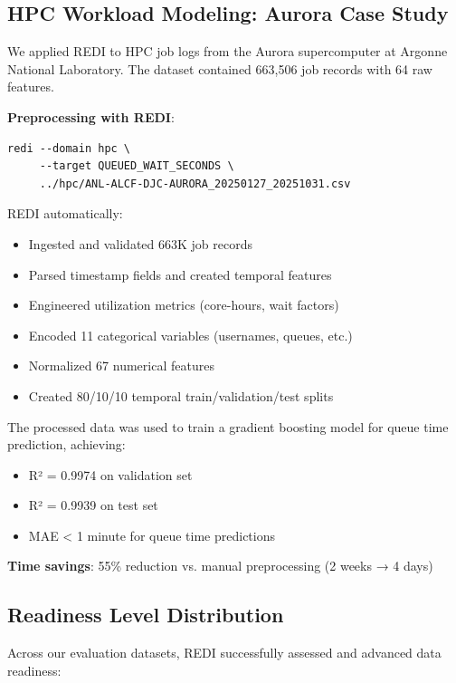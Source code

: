 \documentclass[11pt,letterpaper,twocolumn]{article}
\begin{document}
\subsection{HPC Workload Modeling: Aurora Case Study}

We applied REDI to HPC job logs from the Aurora supercomputer at Argonne National Laboratory. The dataset contained 663,506 job records with 64 raw features.

\textbf{Preprocessing with REDI}:
\begin{verbatim}
redi --domain hpc \
     --target QUEUED_WAIT_SECONDS \
     ../hpc/ANL-ALCF-DJC-AURORA_20250127_20251031.csv
\end{verbatim}

REDI automatically:
\begin{itemize}
    \item Ingested and validated 663K job records
    \item Parsed timestamp fields and created temporal features
    \item Engineered utilization metrics (core-hours, wait factors)
    \item Encoded 11 categorical variables (usernames, queues, etc.)
    \item Normalized 67 numerical features
    \item Created 80/10/10 temporal train/validation/test splits
\end{itemize}

The processed data was used to train a gradient boosting model for queue time prediction, achieving:
\begin{itemize}
    \item R² = 0.9974 on validation set
    \item R² = 0.9939 on test set
    \item MAE < 1 minute for queue time predictions
\end{itemize}

\textbf{Time savings}: 55\% reduction vs. manual preprocessing (2 weeks → 4 days)

\subsection{Readiness Level Distribution}

Across our evaluation datasets, REDI successfully assessed and advanced data readiness:
\end{document}
